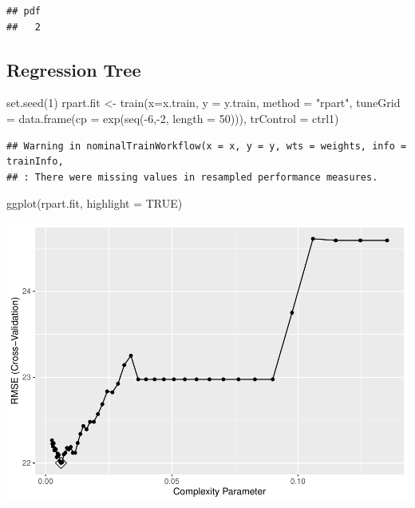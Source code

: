 \documentclass[
]{article}
\newenvironment{Shaded}{\begin{snugshade}}{\end{snugshade}}
\newcommand{\AttributeTok}[1]{\textcolor[rgb]{0.77,0.63,0.00}{#1}}
\newcommand{\ConstantTok}[1]{\textcolor[rgb]{0.00,0.00,0.00}{#1}}
\newcommand{\DecValTok}[1]{\textcolor[rgb]{0.00,0.00,0.81}{#1}}
\newcommand{\FunctionTok}[1]{\textcolor[rgb]{0.00,0.00,0.00}{#1}}
\newcommand{\NormalTok}[1]{#1}
\newcommand{\OtherTok}[1]{\textcolor[rgb]{0.56,0.35,0.01}{#1}}
\newcommand{\SpecialCharTok}[1]{\textcolor[rgb]{0.00,0.00,0.00}{#1}}
\newcommand{\StringTok}[1]{\textcolor[rgb]{0.31,0.60,0.02}{#1}}
\begin{document}
\begin{verbatim}
## pdf 
##   2
\end{verbatim}

\hypertarget{regression-tree}{%
\subsection{Regression Tree}\label{regression-tree}}

\begin{Shaded}
\begin{Highlighting}[]
\FunctionTok{set.seed}\NormalTok{(}\DecValTok{1}\NormalTok{)}
\NormalTok{rpart.fit }\OtherTok{\textless{}{-}} \FunctionTok{train}\NormalTok{(}\AttributeTok{x=}\NormalTok{x.train,}
                   \AttributeTok{y =}\NormalTok{ y.train,}
                   \AttributeTok{method =} \StringTok{"rpart"}\NormalTok{,}
                    \AttributeTok{tuneGrid =} \FunctionTok{data.frame}\NormalTok{(}\AttributeTok{cp =} \FunctionTok{exp}\NormalTok{(}\FunctionTok{seq}\NormalTok{(}\SpecialCharTok{{-}}\DecValTok{6}\NormalTok{,}\SpecialCharTok{{-}}\DecValTok{2}\NormalTok{, }\AttributeTok{length =} \DecValTok{50}\NormalTok{))),}
                    \AttributeTok{trControl =}\NormalTok{ ctrl1)}
\end{Highlighting}
\end{Shaded}

\begin{verbatim}
## Warning in nominalTrainWorkflow(x = x, y = y, wts = weights, info = trainInfo,
## : There were missing values in resampled performance measures.
\end{verbatim}

\begin{Shaded}
\begin{Highlighting}[]
\FunctionTok{ggplot}\NormalTok{(rpart.fit, }\AttributeTok{highlight =} \ConstantTok{TRUE}\NormalTok{)}
\end{Highlighting}
\end{Shaded}

\includegraphics{DSII_final_js5095_files/figure-latex/unnamed-chunk-11-1.pdf}
\end{document}
